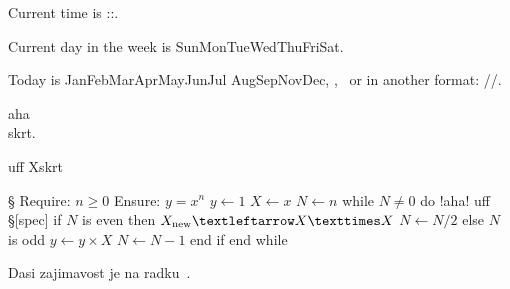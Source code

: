 \TEST \sethours \setseconds \setweekday \hours \minutes \seconds 

\sethours \setseconds
Current time is \the\hours:\Othe\minutes:\Othe\seconds.

\setweekday
Current day in the week is
\ifcase\weekday Sun\or Mon\or Tue\or Wed\or Thu\or Fri\or Sat\fi.

Today is
\ifcase\month\or Jan\or Feb\or Mar\or Apr\or May\or Jun\or Jul\or
   Aug\or Sep\or Nov\or Dec\fi, \the\day, \the\year
\ or in another format: \the\year/\Othe\month/\Othe\day.

\TEST \showpglists


\TEST \runsystem

\runsystem{}

\TEST \cancel

aha\cancel\\{skrt}.

uff \cancel X{skrt}

\TEST \algol

\begtt \ttlineref § \algol
Require: $n ≥ 0$
Ensure: $y = x^n$
   $y ← 1$
   $X ← x$
   $N ← n$
   while $N ≠ 0$ do !aha! uff §[spec]
      if $N$ is even then
         $X_{\rm new} ← X × X$
         $N ← N/2$
      else {$N$ is odd}
         $y ← y × X$
         $N ← N − 1$
      end if
   end while
\endtt

Dasi zajimavost je na radku~\lref[spec].

\bye
